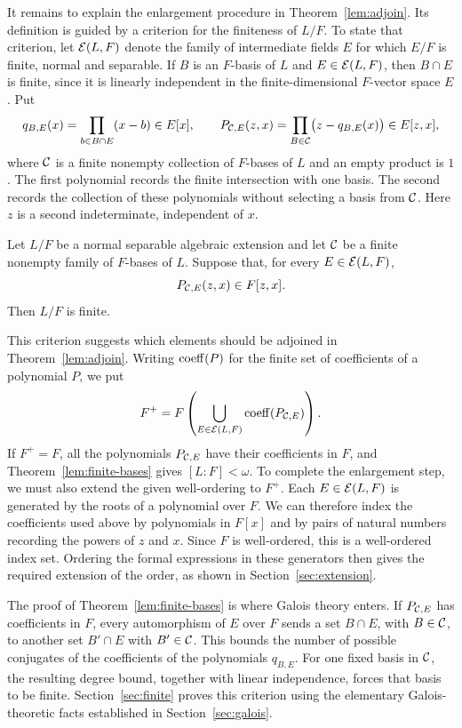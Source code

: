 It remains to explain the enlargement procedure in
Theorem~\ref{lem:adjoin}. Its definition is guided by a criterion for
the finiteness of $L/F$. To state that criterion, let
$\mathcal E(L,F)$ denote the family of intermediate fields $E$ for which
$E/F$ is finite, normal and separable. If $B$ is an $F$-basis of $L$
and $E\in\mathcal E(L,F)$, then $B\cap E$ is finite, since it is linearly
independent in the finite-dimensional $F$-vector space $E$. Put
\[
 q_{B,E}(x)=\prod_{b\in B\cap E}(x-b)\in E[x],
 \qquad
 P_{\mathcal C,E}(z,x)=\prod_{B\in\mathcal C}
                 \bigl(z-q_{B,E}(x)\bigr)\in E[z,x],
\]
where $\mathcal C$ is a finite nonempty collection of $F$-bases of $L$ and
an empty product is $1$. The first polynomial records the finite
intersection with one basis. The second records the collection of
these polynomials without selecting a basis from $\mathcal C$. Here $z$
is a second indeterminate, independent of $x$.

\begin{overviewtheorem}\label{lem:finite-bases}
Let $L/F$ be a normal separable algebraic extension and let $\mathcal C$
be a finite nonempty family of $F$-bases of $L$. Suppose that, for every $E\in\mathcal E(L,F)$,
\begin{equation*}
 P_{\mathcal C,E}(z,x)\in F[z,x].
\end{equation*}
Then $L/F$ is finite.
\end{overviewtheorem}

This criterion suggests which elements should be adjoined in
Theorem~\ref{lem:adjoin}. Writing $\operatorname{coeff}(P)$ for the finite set of
coefficients of a polynomial $P$, we put
\[
 F^+=F\left(\bigcup_{E\in\mathcal E(L,F)}\operatorname{coeff}(P_{\mathcal C,E})\right).
\]
If $F^+=F$, all the polynomials $P_{\mathcal C,E}$ have their coefficients
in $F$, and Theorem~\ref{lem:finite-bases} gives $[L:F]<\omega$.
To complete the enlargement step, we must also extend the given
well-ordering to $F^+$. Each $E\in\mathcal E(L,F)$ is generated by the
roots of a polynomial over $F$. We can therefore index the
coefficients used above by polynomials in $F[x]$ and by pairs of
natural numbers recording the powers of $z$ and $x$. Since $F$ is
well-ordered, this is a well-ordered index set. Ordering the formal
expressions in these generators then gives the required extension
of the order, as shown in Section~\ref{sec:extension}.

The proof of Theorem~\ref{lem:finite-bases} is where Galois theory
enters. If $P_{\mathcal C,E}$ has coefficients in $F$, every automorphism
of $E$ over $F$ sends a set $B\cap E$, with $B\in\mathcal C$, to another
set $B'\cap E$ with $B'\in\mathcal C$. This bounds the number of possible
conjugates of the coefficients of the polynomials $q_{B,E}$.
For one fixed basis in $\mathcal C$, the resulting degree bound, together
with linear independence, forces that basis to be finite.
Section~\ref{sec:finite} proves this criterion using the elementary
Galois-theoretic facts established in Section~\ref{sec:galois}.
